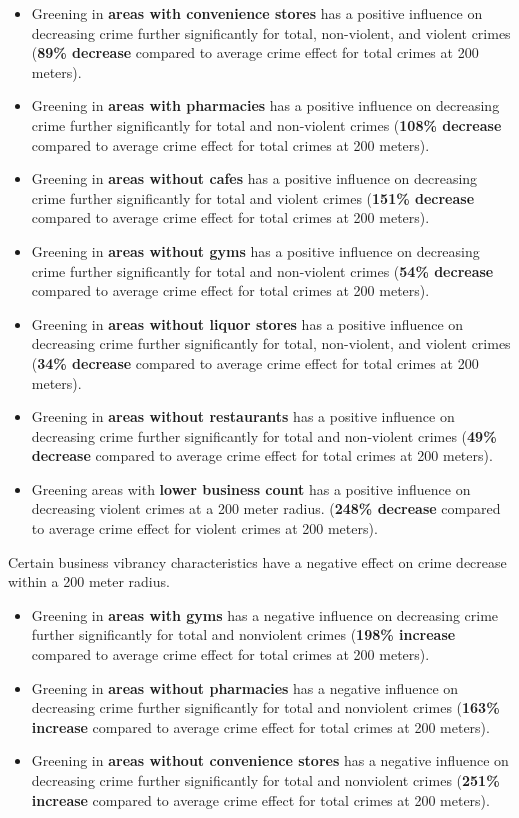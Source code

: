 \documentclass{article}
\begin{document}
\begin{itemize}
    \item Greening in \textbf{areas with convenience stores} has a positive influence on decreasing crime further significantly for total, non-violent, and violent crimes (\textbf{89\% decrease} compared to average crime effect for total crimes at 200 meters).
    \item Greening in \textbf{areas with pharmacies} has a positive influence on decreasing crime further significantly for total and non-violent crimes (\textbf{108\% decrease} compared to average crime effect for total crimes at 200 meters).
    \item Greening in \textbf{areas without cafes} has a positive influence on decreasing crime further significantly for total and violent crimes (\textbf{151\% decrease} compared to average crime effect for total crimes at 200 meters).
    \item Greening in \textbf{areas without gyms} has a positive influence on decreasing crime further significantly for total and non-violent crimes (\textbf{54\% decrease} compared to average crime effect for total crimes at 200 meters).
    \item Greening in \textbf{areas without liquor stores} has a positive influence on decreasing crime further significantly for total, non-violent, and violent crimes (\textbf{34\% decrease} compared to average crime effect for total crimes at 200 meters).
    \item Greening in \textbf{areas without restaurants} has a positive influence on decreasing crime further significantly for total and non-violent crimes (\textbf{49\% decrease} compared to average crime effect for total crimes at 200 meters).
    \item Greening areas with \textbf{lower business count} has a positive influence on decreasing violent crimes at a 200 meter radius. (\textbf{248\% decrease} compared to average crime effect for violent crimes at 200 meters).
\end{itemize}

Certain business vibrancy characteristics have a negative effect on crime decrease within a 200 meter radius.
\begin{itemize}
    \item Greening in \textbf{areas with gyms} has a negative influence on decreasing crime further significantly for total and nonviolent crimes (\textbf{198\% increase} compared to average crime effect for total crimes at 200 meters).
    \item Greening in \textbf{areas without pharmacies} has a negative influence on decreasing crime further significantly for total and nonviolent crimes (\textbf{163\% increase} compared to average crime effect for total crimes at 200 meters).
    \item Greening in \textbf{areas without convenience stores} has a negative influence on decreasing crime further significantly for total and nonviolent crimes (\textbf{251\% increase} compared to average crime effect for total crimes at 200 meters).
\end{itemize}
\end{document}
